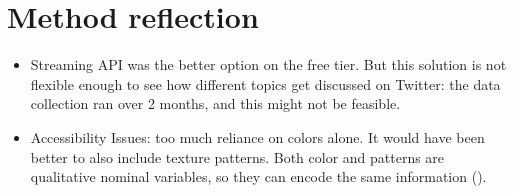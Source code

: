 \section{Method reflection}
\begin{itemize}
    \item Streaming API was the better option on the free tier. But this solution is not flexible enough to see how different topics get discussed on Twitter: the data collection ran over 2 months, and this might not be feasible.
    \item Accessibility Issues: too much reliance on colors alone. It would have been better to also include texture patterns. Both color and patterns are qualitative nominal variables, so they can encode the same information (\cite[1860]{borner2019}).
\end{itemize}